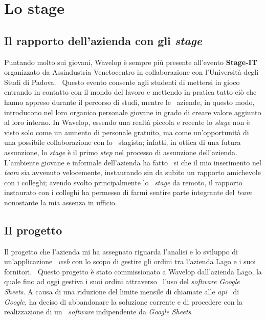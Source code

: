 
\chapter{Lo stage}
\label{cap:stage}
\section{Il rapporto dell'azienda con gli \emph{stage}}
Puntando molto sui giovani, Wavelop è sempre più presente all'evento \textbf{Stage-IT} organizzato da Assindustria Venetocentro in collaborazione con l'Università degli Studi di Padova. \
Questo evento consente agli studenti di mettersi in gioco entrando in contatto con il mondo del lavoro e mettendo in pratica tutto ciò che hanno appreso durante il percorso di studi, mentre le \
aziende, in questo modo, introducono nel loro organico personale giovane in grado di creare valore aggiunto al loro interno.
In Wavelop, essendo una realtà piccola e recente lo \emph{stage} non è visto solo come un aumento di personale gratuito, ma come un'opportunità di una possibile collaborazione con lo \
stagista; infatti, in ottica di una futura assunzione, lo \emph{stage} è il primo \emph{step} nel processo di assunzione dell'azienda. L'ambiente giovane e informale dell'azienda ha fatto \
si che il mio inserimento nel \emph{team} sia avvenuto velocemente, instaurando sin da subito un rapporto amichevole con i colleghi; avendo svolto principalmente lo \
\emph{stage} da remoto, il rapporto instaurato con i colleghi ha permesso di farmi sentire parte integrante del \emph{team} nonostante la mia assenza in ufficio.

\section{Il progetto}
Il progetto che l'azienda mi ha assegnato riguarda l'analisi e lo sviluppo di un'applicazione \
\emph{web} con lo scopo di gestire gli ordini tra l'azienda Lago e i suoi fornitori. \ 
Questo progetto è stato commissionato a Wavelop dall'azienda Lago, la quale fino ad oggi gestiva i suoi ordini attraverso \
l'uso del \emph{software Google Sheets}. A causa di una riduzione del limite mensile di chiamate alle \emph{\acrshort{api}} \
di \emph{Google}, ha deciso di abbandonare la soluzione corrente e di procedere con la realizzazione di un \
\emph{software} indipendente da \emph{Google Sheets}. \\

